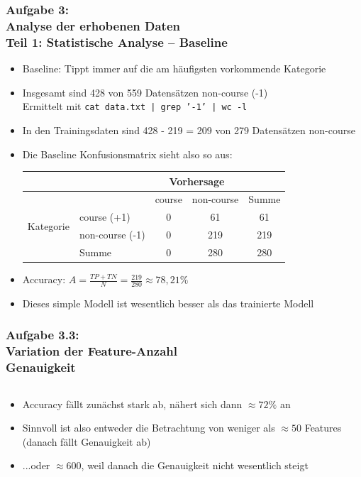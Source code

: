 \documentclass[accentcolor=tud7b,noresetcounter]{tudbeamer}
\begin{document}
	\begin{frame}
		\frametitle{Aufgabe 3:\\ Analyse der erhobenen Daten\\ Teil 1: Statistische Analyse -- Baseline}
		\begin{itemize}
			\item Baseline: Tippt immer auf die am häufigsten vorkommende Kategorie
			\item Insgesamt sind 428 von 559 Datensätzen non-course (-1) \\
			      Ermittelt mit \texttt{cat data.txt | grep '-1' | wc -l}
			\item In den Trainingsdaten sind 428 - 219 = 209 von 279 Datensätzen non-course
			\item Die Baseline Konfusionsmatrix sieht also so aus: \\
			\begin{tabular}{|l|l|c|c||c|}
		\hline
			& & \multicolumn{2}{c|}{Vorhersage} & \\
			\hline
			& & course & non-course & Summe \\
			\hline
		\multirow{2}{*}{Kategorie} & course (+1) & 0 & 61 & 61 \\
		\cline{2-5}
		& non-course (-1) & 0  & 219 & 219\\
		\hline
		& Summe & 0 & 280 & 280 \\
		\hline
		\end{tabular}
			\item Accuracy: $A = \frac{TP + TN}{N} = \frac{219}{280} \approx 78,21\%$
			\item Dieses simple Modell ist wesentlich besser als das trainierte Modell
		\end{itemize}
	\end{frame}
	
	\begin{frame}
	  \frametitle{Aufgabe 3.3:\\ Variation der Feature-Anzahl\\ Genauigkeit}
	    
	    \begin{columns}[T]%
	    \begin{column}{0.3\textwidth}
	    \begin{itemize}[] %
	    \item Accuracy fällt zu\-nächst stark ab, nähert sich dann $\approx72\%$ an
	    \item Sinnvoll ist also entweder die Betrachtung von weniger als $\approx50$ Features (danach fällt Genauigkeit ab)
	    \item ...oder $\approx600$, weil danach die Genauigkeit nicht wesentlich steigt
	    \end{itemize}
	    \end{column}
	    \begin{column}{0.7\textwidth}
	    \end{column}
	    \end{columns}
	   
  
	\end{frame}
	
\end{document}
